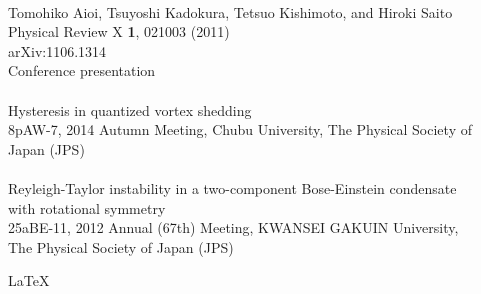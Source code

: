 \documentclass[12pt,a4paper]{jbook}
\begin{document}
\\
Tomohiko Aioi, Tsuyoshi Kadokura, Tetsuo Kishimoto, and Hiroki Saito
\\
Physical Review X {\bf 1}, 021003 (2011)
\\
arXiv:1106.1314
\newpage
\
\\
Conference presentation
\\
\\
Hysteresis in quantized vortex shedding
\\
8pAW-7, 2014 Autumn Meeting, Chubu University, The Physical Society of Japan (JPS)
\\
\\
Reyleigh-Taylor instability in a two-component Bose-Einstein condensate
\\
with rotational symmetry
\\
25aBE-11, 2012 Annual (67th) Meeting, KWANSEI GAKUIN University,
\\
The Physical Society of Japan (JPS)

\begin{flushright}
\LaTeX \\
\end{flushright}
\end{document}
